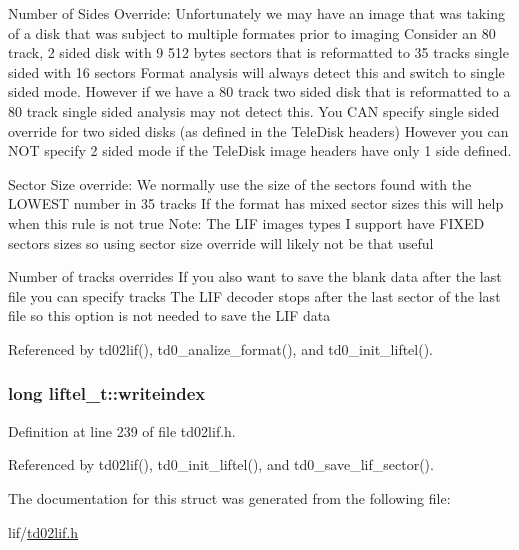 Number of Sides Override\+: Unfortunately we may have an image that was taking of a disk that was subject to multiple formates prior to imaging Consider an 80 track, 2 sided disk with 9 512 bytes sectors that is reformatted to 35 tracks single sided with 16 sectors Format analysis will always detect this and switch to single sided mode. However if we have a 80 track two sided disk that is reformatted to a 80 track single sided analysis may not detect this. You C\+AN specify single sided override for two sided disks (as defined in the Tele\+Disk headers) However you can N\+OT specify 2 sided mode if the Tele\+Disk image headers have only 1 side defined.

Sector Size override\+: We normally use the size of the sectors found with the L\+O\+W\+E\+ST number in 35 tracks If the format has mixed sector sizes this will help when this rule is not true Note\+: The L\+IF images types I support have F\+I\+X\+ED sectors sizes so using sector size override will likely not be that useful

Number of tracks overrides If you also want to save the blank data after the last file you can specify tracks The L\+IF decoder stops after the last sector of the last file so this option is not needed to save the L\+IF data 

Referenced by td02lif(), td0\+\_\+analize\+\_\+format(), and td0\+\_\+init\+\_\+liftel().

\subsubsection[{\texorpdfstring{writeindex}{writeindex}}]{\setlength{\rightskip}{0pt plus 5cm}long liftel\+\_\+t\+::writeindex}\hypertarget{structliftel__t_a3c5f11408ea86ded8a0bc0d20a0ea689}{}\label{structliftel__t_a3c5f11408ea86ded8a0bc0d20a0ea689}


Definition at line 239 of file td02lif.\+h.



Referenced by td02lif(), td0\+\_\+init\+\_\+liftel(), and td0\+\_\+save\+\_\+lif\+\_\+sector().



The documentation for this struct was generated from the following file\+:\begin{DoxyCompactItemize}
\item 
lif/\hyperlink{td02lif_8h}{td02lif.\+h}\end{DoxyCompactItemize}
